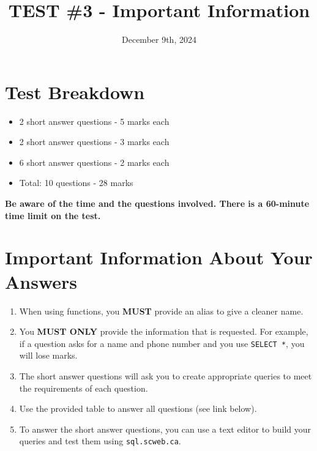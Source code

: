 \documentclass[12pt]{article}
\title{\textbf{TEST \#3 - Important Information}}
\author{}
\date{December 9th, 2024}
\begin{document}
\maketitle

\section*{Test Breakdown}
\begin{itemize}
    \item 2 short answer questions - 5 marks each
    \item 2 short answer questions - 3 marks each
    \item 6 short answer questions - 2 marks each
    \item Total: 10 questions - 28 marks
\end{itemize}

\textbf{Be aware of the time and the questions involved. There is a 60-minute time limit on the test.}

\section*{Important Information About Your Answers}
\begin{enumerate}
    \item When using functions, you \textbf{MUST} provide an alias to give a cleaner name.
    \item You \textbf{MUST ONLY} provide the information that is requested. For example, if a question asks for a name and phone number and you use \texttt{SELECT *}, you will lose marks.
    \item The short answer questions will ask you to create appropriate queries to meet the requirements of each question.
    \item Use the provided table to answer all questions (see link below).
    \item To answer the short answer questions, you can use a text editor to build your queries and test them using \texttt{sql.scweb.ca}.
\end{enumerate}
\end{document}
